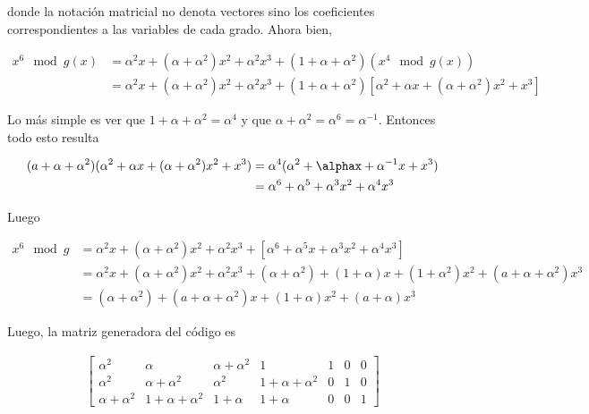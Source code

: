 \documentclass[a4paper]{article}
\begin{document}
donde la notación matricial no denota vectores sino los coeficientes correspondientes a las variables
de cada grado. Ahora bien, 

\begin{align*}
    x^6 \mod g(x) &= \alpha^2 x + (\alpha + \alpha^2)x^2 + \alpha^2x^3 + (1 + \alpha + \alpha^2) (x^4 \mod g(x)) \\ 
    &= \alpha^2 x + (\alpha + \alpha^2)x^2 + \alpha^2x^3 + (1 + \alpha + \alpha^2) \left[ \alpha^2 + \alpha x + (\alpha + \alpha^2) x^2 + x^3 \right] 
\end{align*}

Lo más simple es ver que $1 + \alpha + \alpha^2 = \alpha^4$ y que $\alpha + \alpha^2 = \alpha^6 = \alpha^{-1}$. Entonces todo esto resulta

\begin{align*}
    (a + \alpha + \alpha^2)(\alpha^2 + \alpha x + (\alpha + \alpha^2)x^2 + x^3) &= \alpha^4(\alpha^2 + \alphax + \alpha^{-1} x + x^3) \\ 
                                                                                &= \alpha^6 + \alpha^5 + \alpha^3 x^2 + \alpha^4 x^3
\end{align*}

Luego 

\begin{align*}
    x^6 \mod g &= \alpha^2 x + (\alpha + \alpha^2)x^2 + \alpha^2 x^3 + \left[ \alpha^6 + \alpha^5 x + \alpha^3 x^2 + \alpha^4 x^3 \right]  \\ 
               &= \alpha^2 x + (\alpha + \alpha^2) x^2 + \alpha^2 x^3 + (\alpha + \alpha^2) + (1+\alpha)x + (1 + \alpha^2)x^2 + (a + \alpha + \alpha^2)x^3 \\ 
               &= (\alpha + \alpha^2) + (a + \alpha + \alpha^2)x + (1 + \alpha)x^2 + (a + \alpha) x^3
\end{align*}

Luego, la matriz generadora del código es 

\begin{align*}
    \begin{bmatrix} 
    \alpha^2 & \alpha & \alpha + \alpha^2 & 1 & 1 & 0 & 0 \\ 
    \alpha^2 & \alpha+\alpha^2 & \alpha^2 & 1 + \alpha + \alpha^2 & 0 & 1 &0 \\ 
    \alpha+\alpha^2 & 1 + \alpha + \alpha^2 & 1 + \alpha & 1 + \alpha & 0 & 0 & 1
    \end{bmatrix} 
\end{align*}
\end{document}
